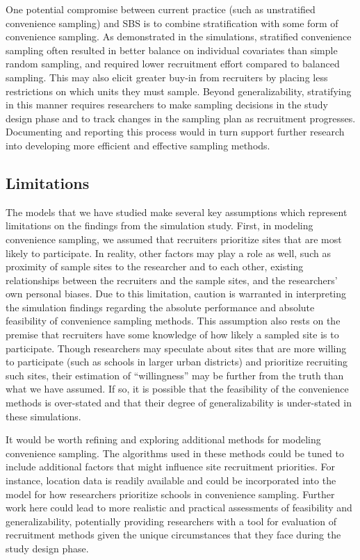 \documentclass[
  man,floatsintext]{apa6}
\begin{document}
One potential compromise between current practice (such as unstratified convenience sampling) and SBS is to combine stratification with some form of convenience sampling. As demonstrated in the simulations, stratified convenience sampling often resulted in better balance on individual covariates than simple random sampling, and required lower recruitment effort compared to balanced sampling. This may also elicit greater buy-in from recruiters by placing less restrictions on which units they must sample.
Beyond generalizability, stratifying in this manner requires researchers to make sampling decisions in the study design phase and to track changes in the sampling plan as recruitment progresses. Documenting and reporting this process would in turn support further research into developing more efficient and effective sampling methods.

\hypertarget{limitations}{%
\subsection*{Limitations}\label{limitations}}

The models that we have studied make several key assumptions which represent limitations on the findings from the simulation study. First, in modeling convenience sampling, we assumed that recruiters prioritize sites that are most likely to participate. In reality, other factors may play a role as well, such as proximity of sample sites to the researcher and to each other, existing relationships between the recruiters and the sample sites, and the researchers' own personal biases.
Due to this limitation, caution is warranted in interpreting the simulation findings regarding the absolute performance and absolute feasibility of convenience sampling methods.
This assumption also rests on the premise that recruiters have some knowledge of how likely a sampled site is to participate. Though researchers may speculate about sites that are more willing to participate (such as schools in larger urban districts) and prioritize recruiting such sites, their estimation of ``willingness'' may be further from the truth than what we have assumed. If so, it is possible that the feasibility of the convenience methods is over-stated and that their degree of generalizability is under-stated in these simulations.

It would be worth refining and exploring additional methods for modeling convenience sampling. The algorithms used in these methods could be tuned to include additional factors that might influence site recruitment priorities. For instance, location data is readily available and could be incorporated into the model for how researchers prioritize schools in convenience sampling. Further work here could lead to more realistic and practical assessments of feasibility and generalizability, potentially providing researchers with a tool for evaluation of recruitment methods given the unique circumstances that they face during the study design phase.
\end{document}
